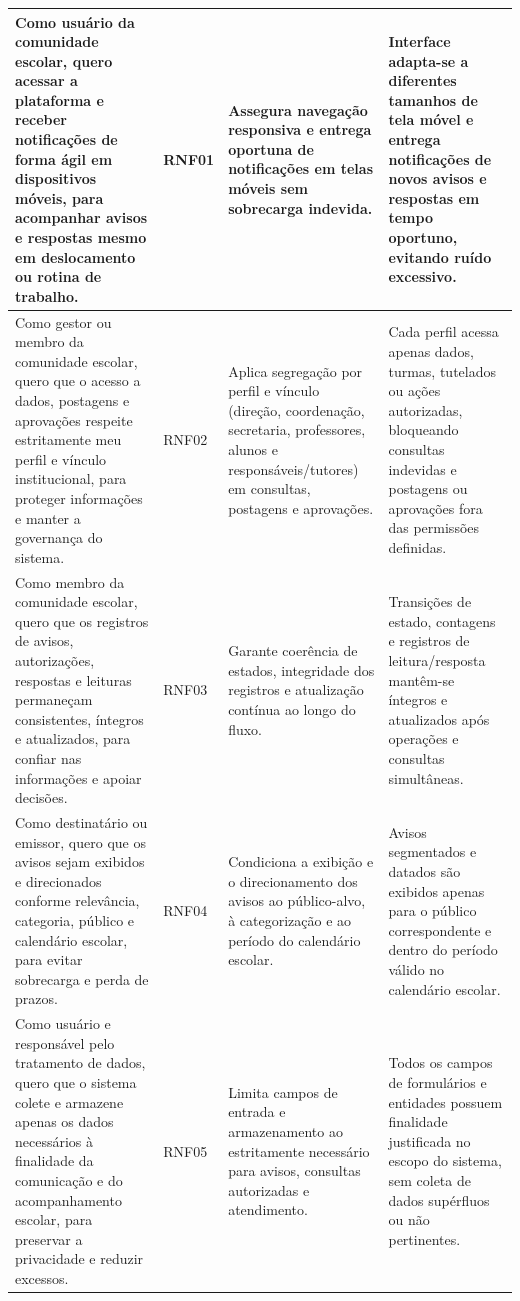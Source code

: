 \documentclass[a4paper,12pt]{report}
\begin{document}
\begin{longtable}{|p{3.8cm}|p{1.8cm}|p{4.2cm}|p{4.8cm}|}
\hline
Como usuário da comunidade escolar, quero acessar a plataforma e receber notificações de forma ágil em dispositivos móveis, para acompanhar avisos e respostas mesmo em deslocamento ou rotina de trabalho. & RNF01 & Assegura navegação responsiva e entrega oportuna de notificações em telas móveis sem sobrecarga indevida. & Interface adapta-se a diferentes tamanhos de tela móvel e entrega notificações de novos avisos e respostas em tempo oportuno, evitando ruído excessivo. \\
\hline
Como gestor ou membro da comunidade escolar, quero que o acesso a dados, postagens e aprovações respeite estritamente meu perfil e vínculo institucional, para proteger informações e manter a governança do sistema. & RNF02 & Aplica segregação por perfil e vínculo (direção, coordenação, secretaria, professores, alunos e responsáveis/tutores) em consultas, postagens e aprovações. & Cada perfil acessa apenas dados, turmas, tutelados ou ações autorizadas, bloqueando consultas indevidas e postagens ou aprovações fora das permissões definidas. \\
\hline
Como membro da comunidade escolar, quero que os registros de avisos, autorizações, respostas e leituras permaneçam consistentes, íntegros e atualizados, para confiar nas informações e apoiar decisões. & RNF03 & Garante coerência de estados, integridade dos registros e atualização contínua ao longo do fluxo. & Transições de estado, contagens e registros de leitura/resposta mantêm-se íntegros e atualizados após operações e consultas simultâneas. \\
\hline
Como destinatário ou emissor, quero que os avisos sejam exibidos e direcionados conforme relevância, categoria, público e calendário escolar, para evitar sobrecarga e perda de prazos. & RNF04 & Condiciona a exibição e o direcionamento dos avisos ao público-alvo, à categorização e ao período do calendário escolar. & Avisos segmentados e datados são exibidos apenas para o público correspondente e dentro do período válido no calendário escolar. \\
\hline
Como usuário e responsável pelo tratamento de dados, quero que o sistema colete e armazene apenas os dados necessários à finalidade da comunicação e do acompanhamento escolar, para preservar a privacidade e reduzir excessos. & RNF05 & Limita campos de entrada e armazenamento ao estritamente necessário para avisos, consultas autorizadas e atendimento. & Todos os campos de formulários e entidades possuem finalidade justificada no escopo do sistema, sem coleta de dados supérfluos ou não pertinentes. \\
\hline
\end{longtable}
\end{document}
